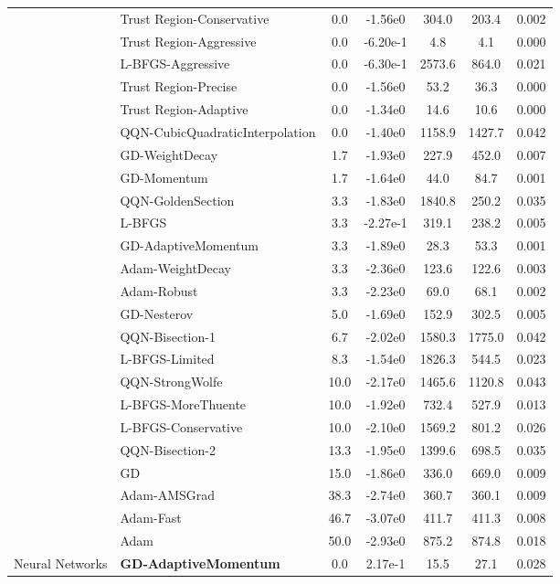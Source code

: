 \documentclass{article}
\begin{document}
\begin{table}[htbp]
{\begin{tabular}{p{2.5cm}p{2.5cm}*{5}{c}}
 & Trust Region-Conservative & 0.0 & -1.56e0 & 304.0 & 203.4 & 0.002 \\
 & Trust Region-Aggressive & 0.0 & -6.20e-1 & 4.8 & 4.1 & 0.000 \\
 & L-BFGS-Aggressive & 0.0 & -6.30e-1 & 2573.6 & 864.0 & 0.021 \\
 & Trust Region-Precise & 0.0 & -1.56e0 & 53.2 & 36.3 & 0.000 \\
 & Trust Region-Adaptive & 0.0 & -1.34e0 & 14.6 & 10.6 & 0.000 \\
 & QQN-CubicQuadraticInterpolation & 0.0 & -1.40e0 & 1158.9 & 1427.7 & 0.042 \\
 & GD-WeightDecay & 1.7 & -1.93e0 & 227.9 & 452.0 & 0.007 \\
 & GD-Momentum & 1.7 & -1.64e0 & 44.0 & 84.7 & 0.001 \\
 & QQN-GoldenSection & 3.3 & -1.83e0 & 1840.8 & 250.2 & 0.035 \\
 & L-BFGS & 3.3 & -2.27e-1 & 319.1 & 238.2 & 0.005 \\
 & GD-AdaptiveMomentum & 3.3 & -1.89e0 & 28.3 & 53.3 & 0.001 \\
 & Adam-WeightDecay & 3.3 & -2.36e0 & 123.6 & 122.6 & 0.003 \\
 & Adam-Robust & 3.3 & -2.23e0 & 69.0 & 68.1 & 0.002 \\
 & GD-Nesterov & 5.0 & -1.69e0 & 152.9 & 302.5 & 0.005 \\
 & QQN-Bisection-1 & 6.7 & -2.02e0 & 1580.3 & 1775.0 & 0.042 \\
 & L-BFGS-Limited & 8.3 & -1.54e0 & 1826.3 & 544.5 & 0.023 \\
 & QQN-StrongWolfe & 10.0 & -2.17e0 & 1465.6 & 1120.8 & 0.043 \\
 & L-BFGS-MoreThuente & 10.0 & -1.92e0 & 732.4 & 527.9 & 0.013 \\
 & L-BFGS-Conservative & 10.0 & -2.10e0 & 1569.2 & 801.2 & 0.026 \\
 & QQN-Bisection-2 & 13.3 & -1.95e0 & 1399.6 & 698.5 & 0.035 \\
 & GD & 15.0 & -1.86e0 & 336.0 & 669.0 & 0.009 \\
 & Adam-AMSGrad & 38.3 & -2.74e0 & 360.7 & 360.1 & 0.009 \\
 & Adam-Fast & 46.7 & -3.07e0 & 411.7 & 411.3 & 0.008 \\
 & Adam & 50.0 & -2.93e0 & 875.2 & 874.8 & 0.018 \\
\midrule
\multirow{25}{*}{Neural Networks} & \textbf{GD-AdaptiveMomentum} & 0.0 & 2.17e-1 & 15.5 & 27.1 & 0.028 \\

\end{tabular}}
\end{table}
\end{document}
